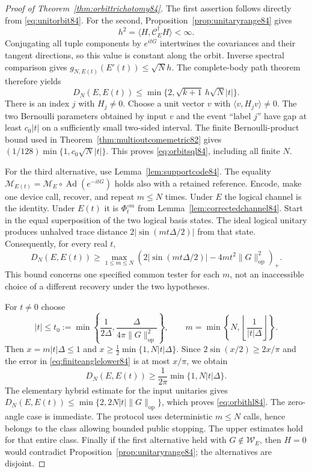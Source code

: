 \begin{proof}[Proof of Theorem~\ref{thm:orbittrichotomy84}]
The first assertion follows directly from \eqref{eq:unitorbit84}.
For the second, Proposition~\ref{prop:unitaryrange84} gives
\[
 h^2=\langle H,\mathcal C_E^\dagger H\rangle<\infty.
\]
Conjugating all tuple components by $e^{itG}$ intertwines the
covariances and their tangent directions, so this value is constant
along the orbit.  Inverse spectral comparison gives
$g_{N,E(t)}(E'(t))\le\sqrt N h$.  The complete-body path theorem
therefore yields
\begin{equation}\label{eq:orbitupper84}
 D_N(E,E(t))\le\min\{2,\sqrt{k+1}\,h\sqrt N|t|\}.
\end{equation}
There is an index $j$ with $H_j\ne0$.  Choose a unit vector $v$
with $\langle v,H_jv\rangle\ne0$.  The two Bernoulli parameters
obtained by input $v$ and the event ``label $j$'' have gap at least
$c_0|t|$ on a sufficiently small two-sided interval.  The finite
Bernoulli-product bound used in
Theorem~\ref{thm:multioutcomemetric82} gives
$(1/128)\min\{1,c_0\sqrt N|t|\}$.  This proves
\eqref{eq:orbitsql84}, including all finite $N$.

For the third alternative, use Lemma~\ref{lem:supportcode84}.
The equality
$\mathcal M_{E(t)}=\mathcal M_E\circ\operatorname{Ad}(e^{-itG})$
holds also with a retained reference.  Encode, make one device call,
recover, and repeat $m\le N$ times.  Under $E$ the logical channel
is the identity.  Under $E(t)$ it is $\Phi_t^{\circ m}$ from
Lemma~\ref{lem:correctedchannel84}.  Start in the equal superposition
of the two logical basis states.  The ideal logical unitary produces
unhalved trace distance $2|\sin(mt\Delta/2)|$ from that state.
Consequently, for every real $t$,
\begin{equation}\label{eq:finiteanglelower84}
 D_N(E,E(t))\ge
 \max_{1\le m\le N}
 \left(2|\sin(mt\Delta/2)|-4mt^2\|G\|_{\mathrm{op}}^2\right)_+.
\end{equation}
This bound concerns one specified common tester for each $m$,
not an inaccessible choice of a different recovery under the two hypotheses.

For $t\ne0$ choose
\[
 |t|\le t_0:=\min\left\{\frac1{2\Delta},
                       \frac{\Delta}{4\pi\|G\|_{\mathrm{op}}^2}\right\},
 \qquad
 m=\min\left\{N,\left\lfloor\frac1{|t|\Delta}\right\rfloor\right\}.
\]
Then $x=m|t|\Delta\le1$ and
$x\ge\tfrac12\min\{1,N|t|\Delta\}$.
Since $2\sin(x/2)\ge2x/\pi$ and the error in
\eqref{eq:finiteanglelower84} is at most $x/\pi$, we obtain
\begin{equation}\label{eq:explicitlocalhl84}
 D_N(E,E(t))\ge\frac1{2\pi}\min\{1,N|t|\Delta\}.
\end{equation}
The elementary hybrid estimate for the input unitaries gives
$D_N(E,E(t))\le\min\{2,2N|t|\|G\|_{\mathrm{op}}\}$,
which proves \eqref{eq:orbithl84}.  The zero-angle case is immediate.
The protocol uses deterministic $m\le N$ calls, hence belongs to
the class allowing bounded public stopping.  The upper estimates
hold for that entire class.  Finally if the first alternative held
with $G\notin\mathcal W_E$, then $H=0$ would contradict
Proposition~\ref{prop:unitaryrange84}; the alternatives are disjoint.
\end{proof}

